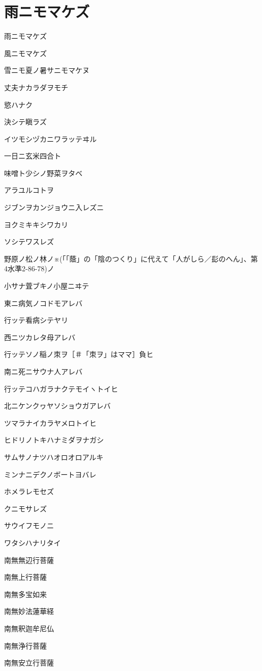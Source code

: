 \section{雨ニモマケズ}

雨ニモマケズ

風ニモマケズ

雪ニモ夏ノ暑サニモマケヌ

丈夫ナカラダヲモチ

慾ハナク

決シテ瞋ラズ

イツモシヅカニワラッテヰル

一日ニ玄米四合ト

味噌ト少シノ野菜ヲタベ

アラユルコトヲ

ジブンヲカンジョウニ入レズニ

ヨクミキキシワカリ

ソシテワスレズ

野原ノ松ノ林ノ※(「「蔭」の「陰のつくり」に代えて「人がしら／髟のへん」、第4水準2-86-78)ノ

小サナ萓ブキノ小屋ニヰテ

東ニ病気ノコドモアレバ

行ッテ看病シテヤリ

西ニツカレタ母アレバ

行ッテソノ稲ノ朿ヲ［＃「朿ヲ」はママ］負ヒ

南ニ死ニサウナ人アレバ

行ッテコハガラナクテモイヽトイヒ

北ニケンクヮヤソショウガアレバ

ツマラナイカラヤメロトイヒ

ヒドリノトキハナミダヲナガシ

サムサノナツハオロオロアルキ

ミンナニデクノボートヨバレ

ホメラレモセズ

クニモサレズ

サウイフモノニ

ワタシハナリタイ



南無無辺行菩薩

南無上行菩薩

南無多宝如来

南無妙法蓮華経

南無釈迦牟尼仏

南無浄行菩薩

南無安立行菩薩